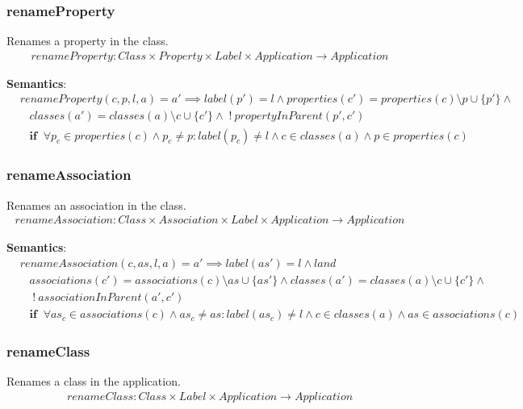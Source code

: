 \documentclass[10pt]{article}
\begin{document}
\subsubsection{renameProperty}
Renames a property in the class.
\begin{align}
renameProperty: Class \times Property \times Label \times Application \rightarrow Application
\end{align}

\noindent \textbf{Semantics}:
\begin{align}
& renameProperty(c, p, l, a) = a' \implies  label(p') = l  \land properties(c') = properties(c) \setminus p \cup \{ p' \} \land \nonumber \\
& \;\;\; classes(a') = classes(a) \setminus c  \cup \{c'\} \land \; ! \: propertyInParent(p', c') \nonumber \\
& \;\;\; \mathbf{if} \;\; \forall p_c \in properties(c) \land p_c \neq p : label(p_c) \neq l \land c \in classes(a) \land p \in properties(c)
\end{align}

\subsubsection{renameAssociation}
Renames an association in the class.
\begin{align}
renameAssociation: Class \times Association \times Label \times Application \rightarrow Application
\end{align}

\noindent \textbf{Semantics}:
\begin{align}
& renameAssociation(c, as, l, a) = a' \implies  label(as') = l  \land land \nonumber \\
& \;\;\; associations(c') = associations(c) \setminus as \cup \{ as' \} \land classes(a') = classes(a) \setminus c  \cup \{c'\} \land \nonumber \\
& \;\;\; \; ! \: associationInParent(a', c') \nonumber \\
& \;\;\; \mathbf{if} \;\; \forall as_c \in associations(c) \land as_c \neq as : label(as_c) \neq l \land c \in classes(a) \land as \in associations(c)
\end{align}

\subsubsection{renameClass}
Renames a class in the application.
\begin{align}
renameClass: Class \times Label \times Application \rightarrow Application
\end{align}
\end{document}
